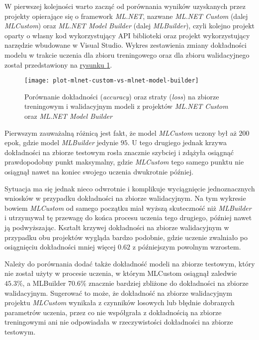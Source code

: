 W pierwszej kolejności warto zacząć od porównania wyników uzyskanych przez projekty opierające się o framework \emph{ML.NET}, nazwane \emph{ML.NET Custom} (dalej \emph{MLCustom}) oraz \emph{ML.NET Model Builder} (dalej \emph{MLBuilder}), czyli kolejno projekt oparty o własny kod wykorzystujący API biblioteki oraz projekt wykorzystujący narzędzie wbudowane w Visual Studio.
Wykres zestawienia zmiany dokładności modelu w trakcie uczenia dla zbioru treningowego oraz dla zbioru walidacyjnego został przedstawiony na \hyperref[fig:plot-mlnet-custom-vs-mlnet-model-builder]{rysunku \ref*{fig:plot-mlnet-custom-vs-mlnet-model-builder}}.

\begin{figure}[ht]
  \texttt{[image: plot-mlnet-custom-vs-mlnet-model-builder]}
  \caption[Porównanie dokładności oraz straty modeli ML.NET Custom oraz ML.NET Model Builder]{Porównanie dokładności (\emph{accuracy}) oraz straty (\emph{loss}) na zbiorze treningowym i walidacyjnym modeli z projektów \emph{ML.NET Custom} oraz \emph{ML.NET Model Builder}}
  \label{fig:plot-mlnet-custom-vs-mlnet-model-builder}
\end{figure}

Pierwszym zauważalną różnicą jest fakt, że model \emph{MLCustom} uczony był aż $200$ epok, gdzie model \emph{MLBuilder} jedynie $95$.
U tego drugiego jednak krzywa dokładności na zbiorze testowym rosła znacznie szybciej i zdążyła osiągnąć prawdopodobny punkt maksymalny, gdzie \emph{MLCustom} tego samego punktu nie osiągnął nawet na koniec swojego uczenia dwukrotnie później.

Sytuacja ma się jednak nieco odwrotnie i komplikuje wyciągnięcie jednoznacznych wniosków w przypadku dokładności na zbiorze walidacyjnym.
Na tym wykresie bowiem \emph{MLCustom} od samego początku miał wyższą skuteczność niż \emph{MLBuilder} i utrzymywał tę przewagę do końca procesu uczenia tego drugiego, później nawet ją podwyższając.
Kształt krzywej dokładności na zbiorze walidacyjnym w przypadku obu projektów wygląda bardzo podobnie, gdzie uczenie zwalniało po osiągnięciu dokładności mniej więcej $0.62$ z późniejszym powolnym wzrostem.

Należy do porównania dodać także dokładność modeli na zbiorze testowym, który nie został użyty w procesie uczenia, w którym MLCustom osiągnął zaledwie $45.3\%$, a MLBuilder $70.6\%$ znacznie bardziej zbliżone do dokładności na zbiorze walidacyjnym.
Sugerować to może, że dokładność na zbiorze walidacyjnym projektu \emph{MLCustom} wynikała z czynników losowych lub błędnie dobranych parametrów uczenia, przez co nie współgrała z dokładnością na zbiorze treningowymi ani nie odpowiadała w rzeczywistości dokładności na zbiorze testowym.


